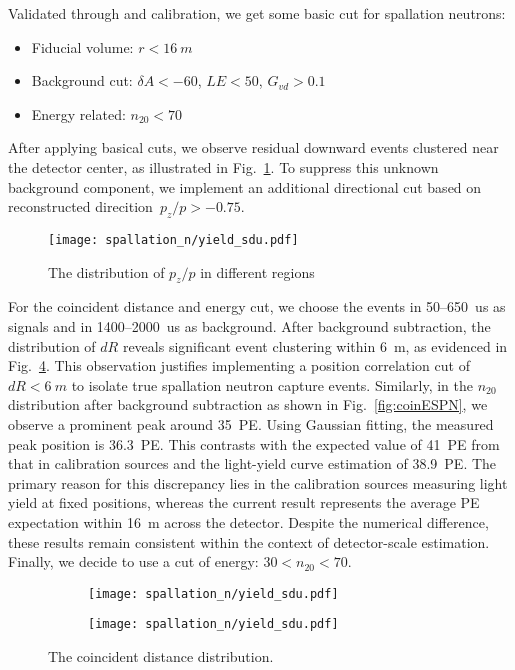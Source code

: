 Validated through  and  calibration, we get some basic cut for spallation neutrons:
\begin{itemize}
	\item Fiducial volume: $r<\SI{16}{m}$
	\item Background cut: $\delta A<-60$, $LE<50$, $G_{vd}>0.1$
	\item Energy related: $n_{20}<70$
\end{itemize}

After applying basical cuts, we observe residual downward events clustered near the detector center, as illustrated in Fig.~\ref{fig:pzcut}. To suppress this unknown background component, we implement an additional directional cut based on reconstructed direcition~$p_z/p>-0.75$.

\begin{figure}[h]
	\centering
	\texttt{[image: spallation\_n/yield\_sdu.pdf]}
	\caption{The distribution of $p_z/p$ in different regions}
	\label{fig:pzcut}
\end{figure}

For the coincident distance and energy cut, we choose the events in 50--\SI{650}{us} as signals and in 1400--\SI{2000}{us} as background.
After background subtraction, the distribution of $dR$ reveals significant event clustering within \SI{6}{m}, as evidenced in Fig.~\ref{fig:coinDisSPN}. This observation justifies implementing a position correlation cut of $dR<\SI{6}{m}$ to isolate true spallation neutron capture events. Similarly, in the $n_{20}$ distribution after background subtraction as shown in Fig.~\ref{fig:coinESPN}, we observe a prominent peak around \SI{35}{PE}. Using Gaussian fitting, the measured peak position is \SI{36.3}{PE}. This contrasts with the expected value of \SI{41}{PE} from that in calibration sources and the light-yield curve estimation of \SI{38.9}{PE}. The primary reason for this discrepancy lies in the calibration sources measuring light yield at fixed positions, whereas the current result represents the average PE expectation within \SI{16}{m} across the detector. Despite the numerical difference, these results remain consistent within the context of detector-scale estimation. Finally, we decide to use a cut of energy: $30<n_{20}<70$.
\begin{figure}[h]
	\centering
	\begin{subfigure}{0.5\textwidth}
		\centering
		\texttt{[image: spallation\_n/yield\_sdu.pdf]}
		\caption{}
		\label{fig:coinDisSPN0}
	\end{subfigure}%
	\begin{subfigure}{0.5\textwidth}
		\centering
		\texttt{[image: spallation\_n/yield\_sdu.pdf]}
		\caption{}
		\label{fig:coinDisSPN1}
	\end{subfigure}
	\caption{The coincident distance distribution.}
	\label{fig:coinDisSPN}
\end{figure}

